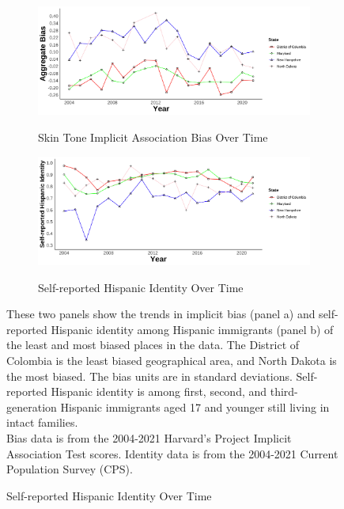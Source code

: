 \documentclass[12pt, fullpage]{article}
\newcommand{\note}[1]{\flushleft\footnotesize{#1}}
\begin{document}
\begin{figure}[H]
\begin{center}

\caption{Bias and Self-reported Hispanic Identity in the Least and Most Biased Places.}

\begin{subfigure}{.9\textwidth}
\caption{Skin Tone Implicit Association Bias Over Time}
\includegraphics[width=.9\linewidth]{figure/Bias_twostates.png} 
\label{fig:skiniat}
\end{subfigure}
\begin{subfigure}{.9\textwidth}
\caption{Self-reported Hispanic Identity Over Time}
\includegraphics[width=.9\linewidth]{figure/Bias_twostates-hisp.png} 
\label{fig:hispanic-twostates}
\end{subfigure}
\flushleft\footnotesize{\note{These two panels show the trends in implicit bias (panel a) and self-reported Hispanic identity among Hispanic immigrants (panel b) of the least and most biased places in the data. The District of Colombia is the least biased geographical area, and North Dakota is the most biased. The bias units are in standard deviations. Self-reported Hispanic identity is among first, second, and third-generation Hispanic immigrants aged 17 and younger still living in intact families.}\\
\note{Bias data is from the 2004-2021 Harvard's Project Implicit Association Test scores. Identity data is from the 2004-2021 Current Population Survey (CPS).}}
\end{center}
\end{figure}
\end{document}
